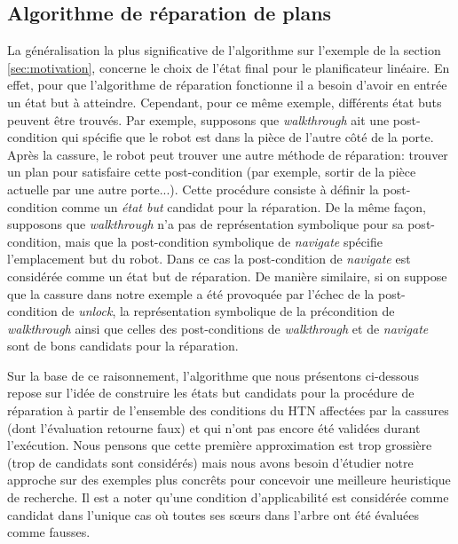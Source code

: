 \documentclass[a4paper,twoside,french]{article}
\begin{document}
		\subsection{Algorithme de réparation de plans}
		\noindent  La généralisation la plus significative de l'algorithme sur l'exemple de la section \ref{sec:motivation}, concerne le choix de l'état final pour le planificateur linéaire.  En effet, pour que l'algorithme de réparation fonctionne il a besoin d'avoir en entrée un état but à atteindre. Cependant, pour ce même exemple, différents état buts peuvent être trouvés. Par exemple, supposons que {\em walkthrough} ait une post-condition qui spécifie que le robot est dans la pièce de l'autre côté de la porte. Après la cassure, le robot peut trouver une autre méthode de réparation: trouver un plan pour satisfaire cette post-condition (par exemple, sortir de la pièce actuelle par une autre porte...). Cette procédure consiste à définir la post-condition comme un  {\em état but}  candidat pour la réparation. De la même façon, supposons que {\em walkthrough} n'a pas de représentation symbolique pour sa post-condition, mais que la post-condition symbolique de {\em navigate} spécifie l'emplacement but du robot. Dans ce cas la post-condition de {\em navigate} est considérée comme un état but de réparation. De manière similaire, si on suppose que la cassure dans notre exemple a été provoquée par l'échec de la post-condition de {\em unlock}, la représentation symbolique de la précondition de {\em walkthrough} ainsi que celles des post-conditions de {\em walkthrough} et de {\em navigate} sont de bons candidats pour la réparation.
		\par Sur la base de ce raisonnement, l'algorithme que nous présentons ci-dessous repose sur l'idée de construire les états but candidats pour la procédure de réparation à partir de l'ensemble  des conditions du HTN  affectées par la cassures (dont l'évaluation retourne faux) et qui n'ont pas encore été validées durant l'exécution. Nous pensons que cette première approximation est trop grossière (trop de candidats sont considérés) mais nous avons besoin d'étudier notre approche sur des exemples plus concrêts pour concevoir une meilleure heuristique de recherche. Il est a noter qu'une condition d'applicabilité est considérée comme candidat dans l'unique cas où toutes ses s\oe urs dans l'arbre ont été évaluées comme fausses.
\end{document}
